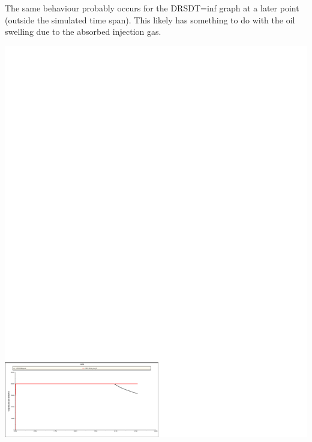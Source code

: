The same behaviour probably occurs for the DRSDT=inf graph at a later point (outside the simulated time span). This likely has something to do with the oil swelling due to the absorbed injection gas.


\pagebreak
\centerline{\includegraphics[clip=true, trim=0cm 0cm 10.6cm 22.6cm,width=1.3\textwidth]{graphics/fopr_comb.pdf}}
